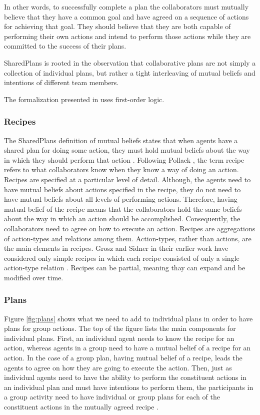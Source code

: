 \documentclass[11pt]{article}
\begin{document}
In other words, to successfully complete a plan the collaborators must mutually
believe that they have a common goal and have agreed on a sequence of actions
for achieving that goal. They should believe that they are both capable of
performing their own actions and intend to perform those actions while they are
committed to the success of their plans.

SharedPlans is rooted in the observation that collaborative plans are not simply
a collection of individual plans, but rather a tight interleaving of mutual
beliefs and intentions of different team members.

The formalization presented in \cite{grosz:collaboration} uses first-order
logic.

\subsubsection{Recipes}

The SharedPlans definition of mutual beliefs states that when agents have a
shared plan for doing some action, they must hold mutual beliefs about the way
in which they should perform that action
\cite{grosz:collaboration,grosz:plans-discourse}. Following Pollack
\cite{pollack:plan-mental-attitudes}, the term recipe refers to what
collaborators know when they know a way of doing an action. Recipes are
specified at a particular level of detail. Although, the agents need to have
mutual beliefs about actions specified in the recipe, they do not need to have
mutual beliefs about all levels of performing actions. Therefore, having mutual
belief of the recipe means that the collaborators hold the same beliefs about
the way in which an action should be accomplished. Consequently, the
collaborators need to agree on how to execute an action. Recipes are
aggregations of action-types and relations among them. Action-types, rather than
actions, are the main elements in recipes. Grosz and Sidner in their earlier
work \cite{grosz:plans-discourse} have considered only simple recipes in which
each recipe consisted of only a single action-type relation
\cite{lochbaum:plan-models}. Recipes can be partial, meaning thay can expand and
be modified over time.

\subsubsection{Plans}

Figure \ref{fig:plans} shows what we need to add to individual plans in order to
have plans for group actions. The top of the figure lists the main components
for individual plans. First, an individual agent needs to know the recipe for an
action, whereas agents in a group need to have a mutual belief of a recipe for
an action. In the case of a group plan, having mutual belief of a recipe, leads
the agents to agree on how they are going to execute the action. Then, just as
individual agents need to have the ability to perform the constituent actions in
an individual plan and must have intentions to perform them, the participants in
a group activity need to have individual or group plans for each of the
constituent actions in the mutually agreed recipe
\cite{grosz:collaborative-systems, grosz:plans-discourse}.
\end{document}
